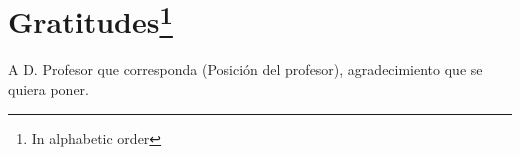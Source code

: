%
%

\chapter*{Gratitudes\footnote{In alphabetic order}}

A D. Profesor que corresponda (Posición del profesor), agradecimiento que se quiera poner.
